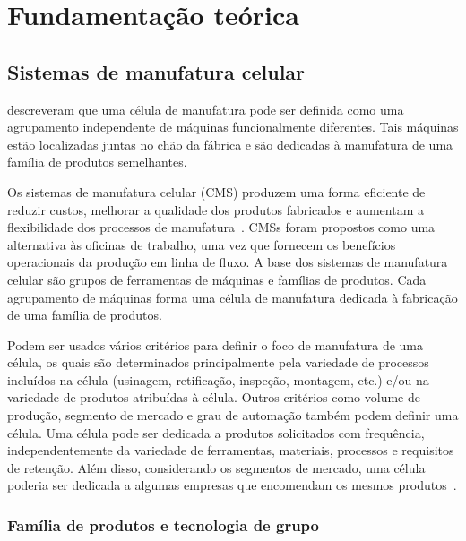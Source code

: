 \chapter{Fundamentação teórica}
\section{Sistemas de manufatura celular}

\cite{ham2012group} descreveram que uma célula de manufatura pode ser definida como uma agrupamento independente de máquinas funcionalmente diferentes. Tais máquinas estão localizadas juntas no chão da fábrica e são dedicadas à manufatura de uma família de produtos semelhantes.

Os sistemas de manufatura celular (CMS) produzem uma forma eficiente de reduzir custos, melhorar a qualidade dos produtos fabricados e aumentam a flexibilidade dos processos de manufatura~\citep{zhang2011modeling}. CMSs foram propostos como uma alternativa às oficinas de trabalho, uma vez que fornecem os benefícios operacionais da produção em linha de fluxo. A base dos sistemas de manufatura celular são grupos de ferramentas de máquinas e famílias de produtos. Cada agrupamento de máquinas forma uma célula de manufatura dedicada à fabricação de uma família de produtos. 

Podem ser usados vários critérios para definir o foco de manufatura de uma célula, os quais são determinados principalmente pela variedade de processos incluídos na célula (usinagem, retificação, inspeção, montagem, etc.) e/ou na variedade de produtos atribuídas à célula. Outros critérios como volume de produção, segmento de mercado e grau de automação também podem definir uma célula. Uma célula pode ser dedicada a produtos solicitados com frequência, independentemente da variedade de ferramentas, materiais, processos e requisitos de retenção. Além disso, considerando os segmentos de mercado, uma célula poderia ser dedicada a algumas empresas que encomendam os mesmos produtos~\citep{irani1999handbook}. 

\subsection{Família de produtos e tecnologia de grupo}

